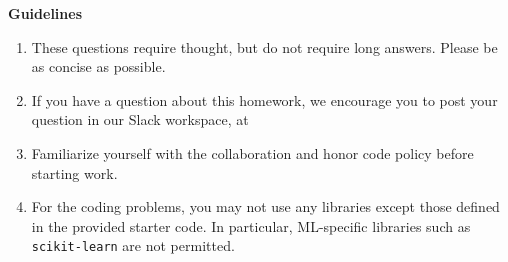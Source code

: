 {\bf Guidelines}
\begin{enumerate}
    \item These questions require thought, but do not require long answers. Please be as concise as possible.
    \item If you have a question about this homework, we encourage you to post your question in our Slack workspace, at \slack
    \item Familiarize yourself with the collaboration and honor code policy before starting work.
    \item For the coding problems, you may not use any libraries except those defined in the provided starter code. In particular, ML-specific libraries such as \texttt{scikit-learn} are not permitted.
\end{enumerate}
